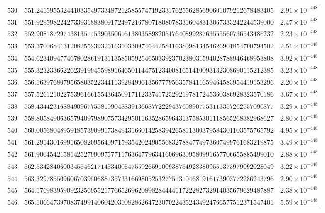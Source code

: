 \documentclass[12pt,reqno]{amsart}
\theoremstyle{remark}
\begin{document}
\begin{longtable}{clc}
$530$ & $551.2415955324410335497334872125855747192331762556285690601079212678483405$ & $2.91\times 10^{-448}$ \\
$531$ & $551.9295982242733931883809172497216780718080783316048313067333242244539000$ & $2.47\times 10^{-448}$ \\
$532$ & $552.9081872974381351453903506161380358982054764089928763555560736543486232$ & $2.23\times 10^{-448}$ \\
$533$ & $553.3700684131208255239326163103309746442584163809813454626901854700794502$ & $2.51\times 10^{-448}$ \\
$534$ & $554.6234094774678028619131135850592546503392370238031594028788946468953808$ & $3.92\times 10^{-448}$ \\
$535$ & $555.3232336622623919945598916465011447512340081651410093132308690115212385$ & $3.23\times 10^{-448}$ \\
$536$ & $556.1639768079565803522344113928499613567779563578411659464583954419153296$ & $2.20\times 10^{-448}$ \\
$537$ & $557.5261210227539616615543645091711233741725292197817245360386928323570186$ & $3.67\times 10^{-448}$ \\
$538$ & $558.4344231688490967755810904883913668772229437608907753113357262557090877$ & $3.29\times 10^{-448}$ \\
$539$ & $558.8058490636579409798907573429501163528659643137585301118565268382968627$ & $2.80\times 10^{-448}$ \\
$540$ & $560.0056804895918573909917384943166014258394265811300379584301103575765792$ & $4.95\times 10^{-448}$ \\
$541$ & $561.2914301699165082095640971593542024905568327884774973607499761683219875$ & $3.49\times 10^{-448}$ \\
$542$ & $561.9004542158142527990975771176364779634160696309580991657706655885499010$ & $2.88\times 10^{-448}$ \\
$543$ & $562.5342840600345546217145340064755926591009387549283809551373979092028049$ & $3.22\times 10^{-448}$ \\
$544$ & $563.3297855096067039506881357331669805253277513104681916173903772286243796$ & $2.90\times 10^{-448}$ \\
$545$ & $564.1769839590923256955217766526962089828444411722282732914035679629487887$ & $2.38\times 10^{-448}$ \\
$546$ & $565.1066473970837499140604203108286264723070224352434924766577512371547401$ & $5.59\times 10^{-448}$ \\

\end{longtable}
\end{document}
